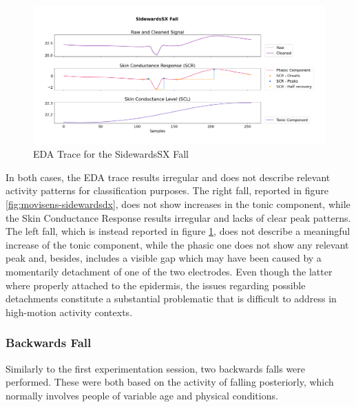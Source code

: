 \begin{figure}[h!]
    \centering
    \includegraphics[width=\textwidth]{./images/movisens/SidewardsSX.png}
    \caption{EDA Trace for the SidewardsSX Fall}
    \label{fig:movisens-sidewardssx}
\end{figure}

In both cases, the EDA trace results irregular and does not describe relevant activity patterns for classification purposes. The right fall, reported in figure \ref{fig:movisens-sidewardsdx}, does not show increases in the tonic component, while the Skin Conductance Response results irregular and lacks of clear peak patterns. The left fall, which is instead reported in figure \ref{fig:movisens-sidewardssx}, does not describe a meaningful increase of the tonic component, while the phasic one does not show any relevant peak and, besides, includes a visible gap which may have been caused by a momentarily detachment of one of the two electrodes. Even though the latter where properly attached to the epidermis, the issues regarding possible detachments constitute a substantial problematic that is difficult to address in high-motion activity contexts.

\subsubsection{Backwards Fall}\label{subsubsec:backwards-fall}

Similarly to the first experimentation session, two backwards falls were performed. These were both based on the activity of falling posteriorly, which normally involves people of variable age and physical conditions.

